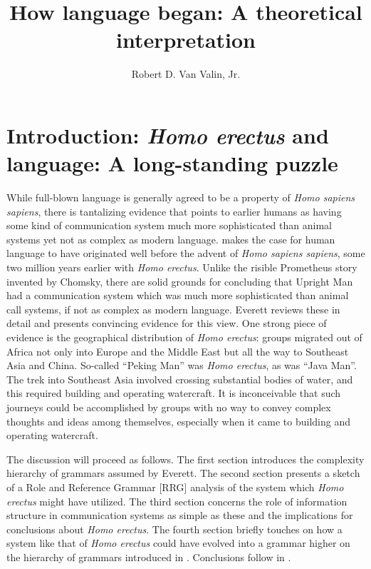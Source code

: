 \documentclass[output=paper,colorlinks,citecolor=brown]{langscibook}
\author[Robert D. {Van Valin, Jr.}]{Robert D. Van Valin, Jr.\orcid{}\affiliation{The State University of New York at Buffalo \& Heinrich Heine University Düsseldorf}}
\title{How language began: A theoretical interpretation}
\begin{document}
\maketitle

\section{Introduction: \emph{Homo erectus} and language: A long-standing puzzle}
While full-blown language is generally agreed to be a property of \emph{Homo sapiens sapiens}, there is tantalizing evidence that points to earlier humans as having some kind of communication system much more sophisticated than animal systems yet not as complex as modern language. \citet{everett2017language} makes the case for human language to have originated well before the advent of \emph{Homo sapiens sapiens}, some two million years earlier with \emph{Homo erectus}. Unlike the risible Prometheus story invented by Chomsky, there are solid grounds for concluding that Upright Man had a communication system which was much more sophisticated than animal call systems, if not as complex as modern language.  Everett reviews these in detail and presents convincing evidence for this view.  One strong piece of evidence is the geographical distribution of \emph{Homo erectus}: groups migrated out of Africa not only into Europe and the Middle East but all the way to Southeast Asia and China.  So-called “Peking Man” was \emph{Homo erectus}, as was “Java Man”.  The trek into Southeast Asia involved crossing substantial bodies of water, and this required building and operating watercraft.  It is inconceivable that such journeys could be accomplished by groups with no way to convey complex thoughts and ideas among themselves, especially when it came to building and operating watercraft.  

The discussion will proceed as follows. The first section introduces the complexity hierarchy of grammars assumed by Everett.  The second section presents a sketch of a Role and Reference Grammar [RRG] \citep{van2005exploring,van1997syntax} analysis of the system which \emph{Homo erectus} might have utilized.  The third section concerns the role of information structure in communication systems as simple as these and the implications for conclusions about \emph{Homo erectus}.  The fourth section briefly touches on how a system like that of \emph{Homo erectus} could have evolved into a grammar higher on the hierarchy of grammars introduced in . Conclusions follow in .
\end{document}

